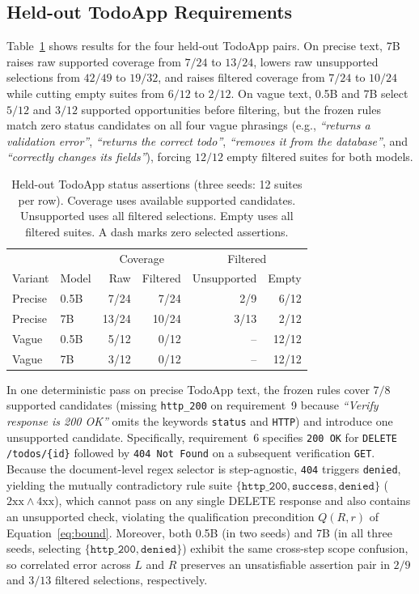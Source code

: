 \subsection{Held-out TodoApp Requirements}
Table~\ref{tab:heldout-status} shows results for the four held-out TodoApp pairs. On precise text, 7B raises raw supported coverage from $7/24$ to $13/24$, lowers raw unsupported selections from $42/49$ to $19/32$, and raises filtered coverage from $7/24$ to $10/24$ while cutting empty suites from $6/12$ to $2/12$. On vague text, 0.5B and 7B select $5/12$ and $3/12$ supported opportunities before filtering, but the frozen rules match zero status candidates on all four vague phrasings (e.g., \emph{``returns a validation error''}, \emph{``returns the correct todo''}, \emph{``removes it from the database''}, and \emph{``correctly changes its fields''}), forcing $12/12$ empty filtered suites for both models.

\begin{table}[t]
\caption{Held-out TodoApp status assertions (three seeds: 12 suites per row). Coverage uses available supported candidates. Unsupported uses all filtered selections. Empty uses all filtered suites. A dash marks zero selected assertions.}
\label{tab:heldout-status}
\centering\small
\setlength{\tabcolsep}{4pt}
\begin{tabular}{llrrrr}
\toprule
 & & \multicolumn{2}{c}{Coverage} & \multicolumn{2}{c}{Filtered}\\
Variant & Model & Raw & Filtered & Unsupported & Empty\\
\midrule
Precise & 0.5B & 7/24 & 7/24 & 2/9 & 6/12\\
Precise & 7B & 13/24 & 10/24 & 3/13 & 2/12\\
Vague & 0.5B & 5/12 & 0/12 & -- & 12/12\\
Vague & 7B & 3/12 & 0/12 & -- & 12/12\\
\bottomrule
\end{tabular}
\end{table}

In one deterministic pass on precise TodoApp text, the frozen rules cover $7/8$ supported candidates (missing \texttt{http\_200} on requirement~9 because \emph{``Verify response is 200 OK''} omits the keywords \texttt{status} and \texttt{HTTP}) and introduce one unsupported candidate. Specifically, requirement~6 specifies \texttt{200 OK} for \texttt{DELETE /todos/\{id\}} followed by \texttt{404 Not Found} on a subsequent verification \texttt{GET}. Because the document-level regex selector is step-agnostic, \texttt{404} triggers \texttt{denied}, yielding the mutually contradictory rule suite $\{\texttt{http\_200},\texttt{success},\texttt{denied}\}$ ($2\text{xx}\wedge 4\text{xx}$), which cannot pass on any single DELETE response and also contains an unsupported check, violating the qualification precondition $Q(R,r)$ of Equation~\ref{eq:bound}. Moreover, both 0.5B (in two seeds) and 7B (in all three seeds, selecting $\{\texttt{http\_200},\texttt{denied}\}$) exhibit the same cross-step scope confusion, so correlated error across $L$ and $R$ preserves an unsatisfiable assertion pair in $2/9$ and $3/13$ filtered selections, respectively.

